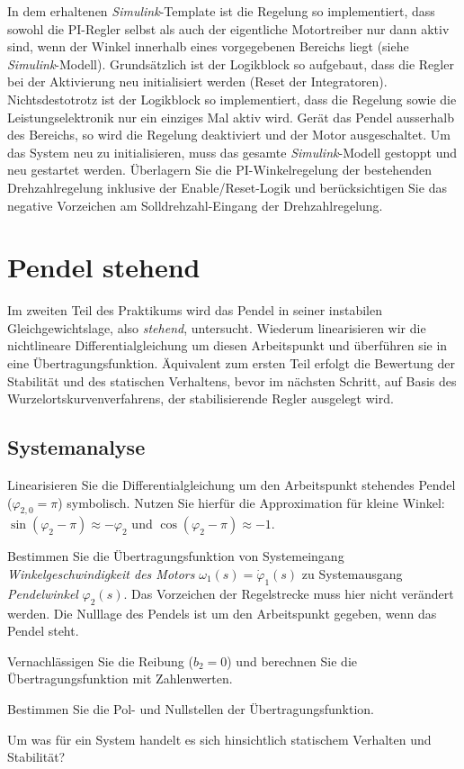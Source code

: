 \documentclass[a4paper,11pt]{scrartcl}
\begin{document}
In dem erhaltenen \emph{Simulink}-Template ist die Regelung so implementiert, dass sowohl die PI-Regler selbst als auch der eigentliche Motortreiber nur dann aktiv sind, wenn der Winkel innerhalb eines vorgegebenen Bereichs liegt (siehe \emph{Simulink}-Modell). Grundsätzlich ist der Logikblock so aufgebaut, dass die Regler bei der Aktivierung neu initialisiert werden (Reset der Integratoren). Nichtsdestotrotz ist der Logikblock so implementiert, dass die Regelung sowie die Leistungselektronik nur ein einziges Mal aktiv wird. Gerät das Pendel ausserhalb des Bereichs, so wird die Regelung deaktiviert und der Motor ausgeschaltet. Um das System neu zu initialisieren, muss das gesamte \emph{Simulink}-Modell gestoppt und neu gestartet werden. Überlagern Sie die PI-Winkelregelung der bestehenden Drehzahlregelung inklusive der Enable/Reset-Logik und berücksichtigen Sie das negative Vorzeichen am Solldrehzahl-Eingang der Drehzahlregelung.

\section{Pendel stehend}

Im zweiten Teil des Praktikums wird das Pendel in seiner instabilen Gleichgewichtslage, also \emph{stehend}, untersucht. Wiederum linearisieren wir die nichtlineare Differentialgleichung um diesen Arbeitspunkt und überführen sie in eine Übertragungsfunktion. Äquivalent zum ersten Teil erfolgt die Bewertung der Stabilität und des statischen Verhaltens, bevor im nächsten Schritt, auf Basis des Wurzelortskurvenverfahrens, der stabilisierende Regler ausgelegt wird.

\subsection*{Systemanalyse}

\begin{aufgaben}
    \item Linearisieren Sie die Differentialgleichung um den Arbeitspunkt stehendes Pendel ($\varphi_{2,0} = \pi$) symbolisch. Nutzen Sie hierfür die Approximation für kleine Winkel: $\sin\left(\varphi_2-\pi\right) \approx -\varphi_2$ und $\cos\left(\varphi_2-\pi\right) \approx -1$.
    \item Bestimmen Sie die Übertragungsfunktion von Systemeingang \emph{Winkelgeschwindigkeit des Motors} $\omega_1(s)=\dot{\varphi}_1(s)$ zu Systemausgang \emph{Pendelwinkel} $\varphi_2(s)$. Das Vorzeichen der Regelstrecke muss hier nicht verändert werden. Die Nulllage des Pendels ist um den Arbeitspunkt gegeben, wenn das Pendel steht.
    \item Vernachlässigen Sie die Reibung ($b_2 = 0$) und berechnen Sie die Übertragungsfunktion mit Zahlenwerten.
    \item Bestimmen Sie die Pol- und Nullstellen der Übertragungsfunktion.
    \item Um was für ein System handelt es sich hinsichtlich statischem Verhalten und Stabilität?
\end{aufgaben}
\end{document}
